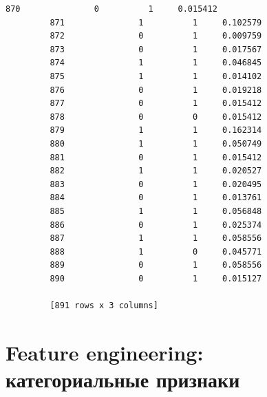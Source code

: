 \documentclass[11pt]{article}
\begin{document}
\begin{Verbatim}[commandchars=\\\{\}]
         870               0          1     0.015412
         871               1          1     0.102579
         872               0          1     0.009759
         873               0          1     0.017567
         874               1          1     0.046845
         875               1          1     0.014102
         876               0          1     0.019218
         877               0          1     0.015412
         878               0          0     0.015412
         879               1          1     0.162314
         880               1          1     0.050749
         881               0          1     0.015412
         882               1          1     0.020527
         883               0          1     0.020495
         884               0          1     0.013761
         885               1          1     0.056848
         886               0          1     0.025374
         887               1          1     0.058556
         888               1          0     0.045771
         889               0          1     0.058556
         890               0          1     0.015127
         
         [891 rows x 3 columns]
\end{Verbatim}
            
    \hypertarget{feature-engineering-ux43aux430ux442ux435ux433ux43eux440ux438ux430ux43bux44cux43dux44bux435-ux43fux440ux438ux437ux43dux430ux43aux438}{%
\section{Feature engineering: категориальные
признаки}\label{feature-engineering-ux43aux430ux442ux435ux433ux43eux440ux438ux430ux43bux44cux43dux44bux435-ux43fux440ux438ux437ux43dux430ux43aux438}}
\end{document}

